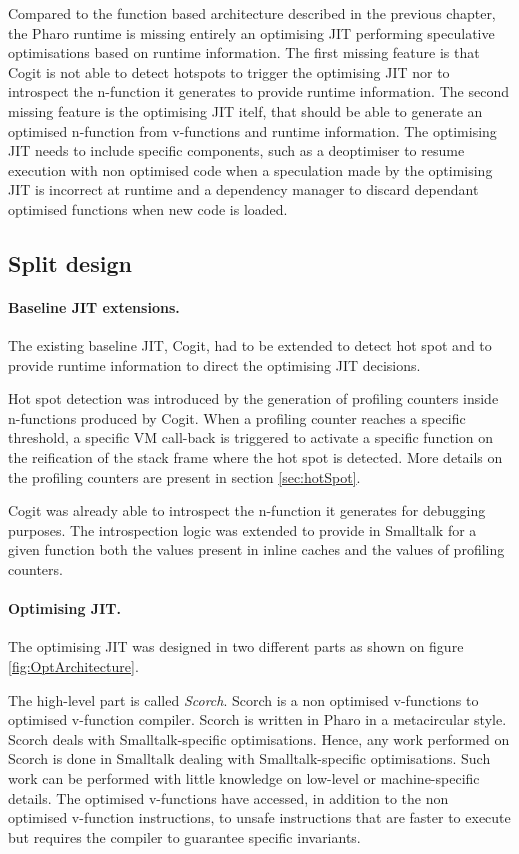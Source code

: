 \documentclass[a4paper,12pt,twoside]{../includes/ThesisStyle}
\begin{document}
Compared to the function based architecture described in the previous chapter, the Pharo runtime is missing entirely an optimising JIT performing speculative optimisations based on runtime information. The first missing feature is that Cogit is not able to detect hotspots to trigger the optimising JIT nor to introspect the n-function it generates to provide runtime information. The second missing feature is the optimising JIT itelf, that should be able to generate an optimised n-function from v-functions and runtime information. The optimising JIT needs to include specific components, such as a deoptimiser to resume execution with non optimised code when a speculation made by the optimising JIT is incorrect at runtime and a dependency manager to discard dependant optimised functions when new code is loaded.

\subsection{Split design}
\label{sec:splitDesign}

\paragraph{Baseline JIT extensions.}
The existing baseline JIT, Cogit, had to be extended to detect hot spot and to provide runtime information to direct the optimising JIT decisions. 

Hot spot detection was introduced by the generation of profiling counters inside n-functions produced by Cogit. When a profiling counter reaches a specific threshold, a specific VM call-back is triggered to activate a specific function on the reification of the stack frame where the hot spot is detected. More details on the profiling counters are present in section \ref{sec:hotSpot}.

Cogit was already able to introspect the n-function it generates for debugging purposes. The introspection logic was extended to provide in Smalltalk for a given function both the values present in inline caches and the values of profiling counters.

\paragraph{Optimising JIT.}
The optimising JIT was designed in two different parts as shown on figure \ref{fig:OptArchitecture}. 

The high-level part is called \emph{Scorch}. Scorch is a non optimised v-functions to optimised v-function compiler. Scorch is written in Pharo in a metacircular style. Scorch deals with Smalltalk-specific optimisations. Hence, any work performed on Scorch is done in Smalltalk dealing with Smalltalk-specific optimisations. Such work can be performed with little knowledge on low-level or machine-specific details. The optimised v-functions have accessed, in addition to the non optimised v-function instructions, to unsafe instructions that are faster to execute but requires the compiler to guarantee specific invariants.
\end{document}
